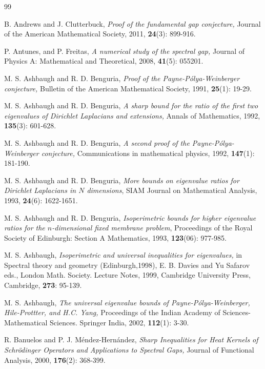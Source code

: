 \documentclass[12pt]{article}
\numberwithin{equation}{section}
\begin{document}
\begin{thebibliography}{99}

B. Andrews and J. Clutterbuck, {\it Proof of the fundamental gap conjecture,} Journal of the American Mathematical Society, 2011, {\bf 24}(3): 899-916.

P. Antunes, and P. Freitas, {\it A numerical study of the spectral gap,} Journal of Physics A: Mathematical and Theoretical,  2008,  {\bf 41}(5):
055201.

M. S. Ashbaugh and R. D. Benguria, {\it Proof of the Payne-P\'{o}lya-Weinberger conjecture,} Bulletin of the American Mathematical Society, 1991, {\bf 25}(1): 19-29.

M. S. Ashbaugh and R. D. Benguria, {\it A sharp bound for the ratio of the first two eigenvalues of
Dirichlet Laplacians and extensions,} Annals of Mathematics, 1992, {\bf 135}(3): 601-628.

M. S. Ashbaugh and R. D. Benguria,  {\it A second proof of the Payne-P\'{o}lya-Weinberger conjecture,}
Communications in mathematical physics, 1992, {\bf 147}(1): 181-190.

M. S. Ashbaugh and R. D. Benguria, {\it More bounds on eigenvalue ratios for Dirichlet Laplacians in
$N$ dimensions}, SIAM Journal on Mathematical Analysis,  1993, {\bf 24}(6): 1622-1651.

M. S. Ashbaugh and R. D. Benguria, {\it Isoperimetric bounds for higher eigenvalue ratios for the $n$-dimensional fixed membrane problem},
Proceedings of the Royal Society of Edinburgh: Section A Mathematics, 1993,  {\bf 123}(06): 977-985.

M. S. Ashbaugh, {\it Isoperimetric and universal inequalities for eigenvalues,}  in Spectral theory and
geometry (Edinburgh,1998), E. B. Davies and Yu Safarov eds., London Math. Society. Lecture Notes,
1999, Cambridge University Press, Cambridge, {\bf 273}: 95-139.

M. S. Ashbaugh, {\it The universal eigenvalue bounds of Payne-P\'{o}lya-Weinberger,  Hile-Prottter, and
H.C. Yang,} Proceedings of the Indian Academy of Sciences-Mathematical Sciences. Springer India, 2002,  {\bf 112}(1): 3-30.

R. Banuelos and P. J. M\'{e}ndez-Hern\'{a}ndez,  {\it Sharp Inequalities for Heat Kernels of
Schr\"{o}dinger Operators and Applications to Spectral Gaps,} Journal of Functional Analysis, 2000, {\bf 176}(2): 368-399.


\end{thebibliography}
\end{document}
